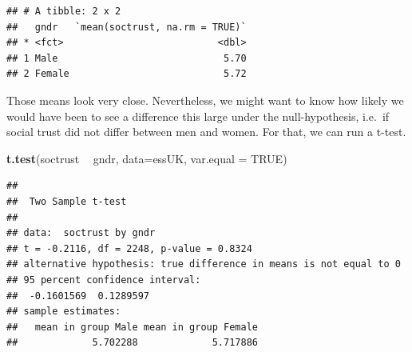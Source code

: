 \documentclass[
]{book}
\newenvironment{Shaded}{\begin{snugshade}}{\end{snugshade}}
\newcommand{\DataTypeTok}[1]{\textcolor[rgb]{0.13,0.29,0.53}{#1}}
\newcommand{\DecValTok}[1]{\textcolor[rgb]{0.00,0.00,0.81}{#1}}
\newcommand{\KeywordTok}[1]{\textcolor[rgb]{0.13,0.29,0.53}{\textbf{#1}}}
\newcommand{\NormalTok}[1]{#1}
\newcommand{\OperatorTok}[1]{\textcolor[rgb]{0.81,0.36,0.00}{\textbf{#1}}}
\newcommand{\OtherTok}[1]{\textcolor[rgb]{0.56,0.35,0.01}{#1}}
\newcommand{\StringTok}[1]{\textcolor[rgb]{0.31,0.60,0.02}{#1}}
\begin{document}
\begin{Shaded}
\end{Shaded}

\begin{verbatim}
## # A tibble: 2 x 2
##   gndr   `mean(soctrust, na.rm = TRUE)`
## * <fct>                           <dbl>
## 1 Male                             5.70
## 2 Female                           5.72
\end{verbatim}

Those means look very close. Nevertheless, we might want to know how likely we would have been to see a difference this large under the null-hypothesis, i.e.~if social trust did not differ between men and women. For that, we can run a t-test.

\begin{Shaded}
\begin{Highlighting}[]
\KeywordTok{t.test}\NormalTok{(soctrust }\OperatorTok{~}\StringTok{ }\NormalTok{gndr, }\DataTypeTok{data=}\NormalTok{essUK, }\DataTypeTok{var.equal =} \OtherTok{TRUE}\NormalTok{)}
\end{Highlighting}
\end{Shaded}

\begin{verbatim}
## 
## 	Two Sample t-test
## 
## data:  soctrust by gndr
## t = -0.2116, df = 2248, p-value = 0.8324
## alternative hypothesis: true difference in means is not equal to 0
## 95 percent confidence interval:
##  -0.1601569  0.1289597
## sample estimates:
##   mean in group Male mean in group Female 
##             5.702288             5.717886
\end{verbatim}
\end{document}
